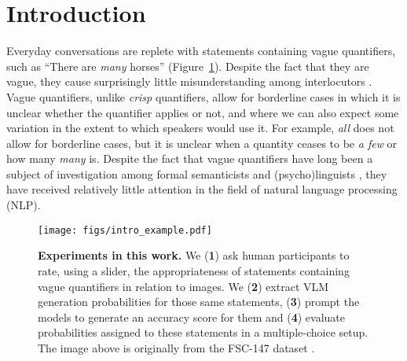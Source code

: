 \section{Introduction}
Everyday conversations are replete with statements containing vague quantifiers, such as ``There are {\em many} horses'' (Figure~\ref{fig:intro_example}). Despite the fact that they are vague, they cause surprisingly little misunderstanding among interlocutors \citep{jucker2003-vagueness}. 
Vague quantifiers, unlike \emph{crisp} quantifiers, allow for borderline cases in which it is unclear whether the quantifier applies or not, and where we can also expect some variation in the extent to which speakers would use it. 
For example, \textit{all} does not allow for borderline cases, but it is unclear when a quantity ceases to be \textit{a few} or how many \textit{many} is.
Despite the fact that vague quantifiers have long been a subject of investigation among formal semanticists \citep[see e.g.][]{nouwen2010-quantifier} and (psycho)linguists \citep[e.g.][]{moxey1993-book,deemter2010-vagueness}, they have received relatively little attention in the field of natural language processing (NLP).


\begin{figure}[t]
    \centering
    \texttt{[image: figs/intro\_example.pdf]}
    \caption{\textbf{Experiments in this work.} We (\textbf{1}) ask human participants to rate, using a slider, the appropriateness of statements containing  vague quantifiers in relation to images. We (\textbf{2}) extract VLM generation probabilities for those same statements, (\textbf{3}) prompt the models to generate an accuracy score for them and (\textbf{4}) evaluate probabilities assigned to these statements in a multiple-choice setup. The image above is originally from the FSC-147 dataset \citep{ranjan2021-fsc147}.}
    \label{fig:intro_example}
\end{figure}

